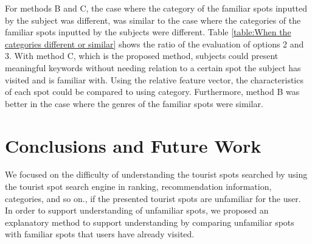 \documentclass[journal]{IAENGtran}
\begin{document}
For methods B and C, the case where the category of the familiar spots inputted by the subject was different, was similar to the case where the categories of the familiar spots inputted by the subjects were different.
Table \ref{table:When the categories different or similar} shows the ratio of the evaluation of options 2 and 3.
With method C, which is the proposed method, subjects could present meaningful keywords without needing relation to a certain spot the subject has visited and is familiar with.
Using the relative feature vector, the characteristics of each spot could be compared to using category.
Furthermore, method B was better in the case where the genres of the familiar spots were similar.


\section{Conclusions and Future Work}
\label{sec:Conclusions and Future Work}

We focused on the difficulty of understanding the tourist spots searched by using the tourist spot search engine in ranking, recommendation information, categories, and so on., if the presented tourist spots are unfamiliar for the user.
In order to support understanding of unfamiliar spots, we proposed an explanatory method to support understanding by comparing unfamiliar spots with familiar spots that users have already visited.
\end{document}
